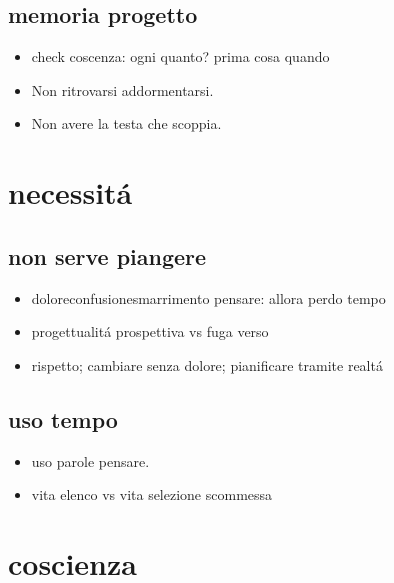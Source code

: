 \subsection{memoria progetto}

\begin{itemize}



\item check coscenza: ogni quanto? prima cosa quando 

\item Non ritrovarsi addormentarsi.

\item Non avere la testa che scoppia.

\end{itemize}


\section{necessit\'a}

\subsection{non serve piangere}

\begin{itemize}

\item doloreconfusionesmarrimento pensare: allora perdo tempo

\item progettualit\'a prospettiva vs fuga verso

\item rispetto;  cambiare senza dolore; pianificare tramite realt\'a

\end{itemize}

\subsection{uso tempo}

\begin{itemize}

\item uso parole pensare.

\item vita elenco vs vita selezione scommessa

\end{itemize}


\section{coscienza}

